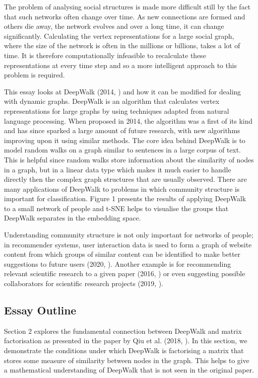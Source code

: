 \documentclass[a4paper]{article}
\begin{document}
The problem of analysing social structures is made more difficult still by the
fact that such networks often change over time. As new connections are formed
and others die away, the network evolves and over a long time, it can
change significantly. Calculating the vertex representations for a large social
graph, where the size of the network is often in the millions or billions, takes
a lot of time. It is therefore computationally infeasible to recalculate these
representations at every time step and so a more intelligent approach to this
problem is required.

This essay looks at DeepWalk (2014, \cite{deepwalk}) and how it can be modified for dealing with dynamic
graphs. DeepWalk is an algorithm that calculates vertex representations for
large graphs by using techniques adapted from natural language processing. When proposed in 2014,
 the algorithm was a first of its kind and has since sparked a large amount of future research, with new
algorithms improving upon it using similar methods. The core idea behind DeepWalk is to model random walks
on a graph similar to sentences in a large corpus of text. This is helpful since random walks store information
about the similarity of nodes in a graph, but in a linear data type which makes it much easier to handle directly then the
complex graph structures that are usually observed. There are many applications of DeepWalk to problems in which community structure is important for classification. Figure 1 presents the results of applying DeepWalk to a small network of people and t-SNE helps to visualise the groups that DeepWalk separates in the embedding space.

Understanding community structure is not only important for networks of people; in recommender systems, user interaction data is used to form a graph of website content from which groups of similar content can be identified to make better suggestions to future users (2020, \cite{bai2020}). Another example is for recommending relevant scientific research to a given paper (2016, \cite{zhao2016}) or even suggesting possible collaborators for scientific research projects (2019, \cite{xu2019}).


\subsection{Essay Outline}
Section 2 explores the fundamental connection between DeepWalk and
matrix factorisation as presented in the paper by Qiu et al. (2018, \cite{qiu2018}). In
this section, we demonstrate the conditions under which DeepWalk is factorising
a matrix that stores some measure of similarity between
nodes in the graph. This helps to give a mathematical understanding of DeepWalk that is not seen in the original paper.
\end{document}
